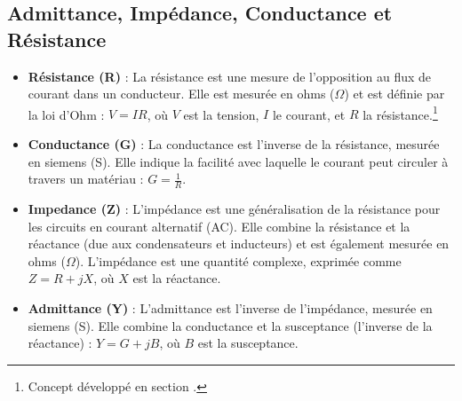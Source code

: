 \subsection{Admittance, Imp\'edance, Conductance et Résistance}
\begin{itemize}
    \item \textbf{Résistance (R)} : La résistance est une mesure de l’opposition au flux de courant dans un conducteur.
    Elle est mesurée en ohms (\(\Omega\)) et est définie par la loi d’Ohm : \(V = IR\), où \(V\) est la tension, \(I\) le courant, et \(R\) la résistance.\footnote{Concept d\'evelopp\'e en section .}
    \item \textbf{Conductance (G)} : La conductance est l’inverse de la résistance, mesurée en siemens (S).
    Elle indique la facilité avec laquelle le courant peut circuler à travers un matériau : \(G = \frac{1}{R}\).
    \item \textbf{Impedance (Z)} : L’impédance est une généralisation de la résistance pour les circuits en courant alternatif (AC).
    Elle combine la résistance et la réactance (due aux condensateurs et inducteurs) et est également mesurée en ohms (\(\Omega\)).
    L’impédance est une quantité complexe, exprimée comme \(Z = R + jX\), où \(X\) est la réactance.
    \item \textbf{Admittance (Y)} : L’admittance est l’inverse de l’impédance, mesurée en siemens (S).
    Elle combine la conductance et la susceptance (l’inverse de la réactance) : \(Y = G + jB\), où \(B\) est la susceptance.
\end{itemize}
